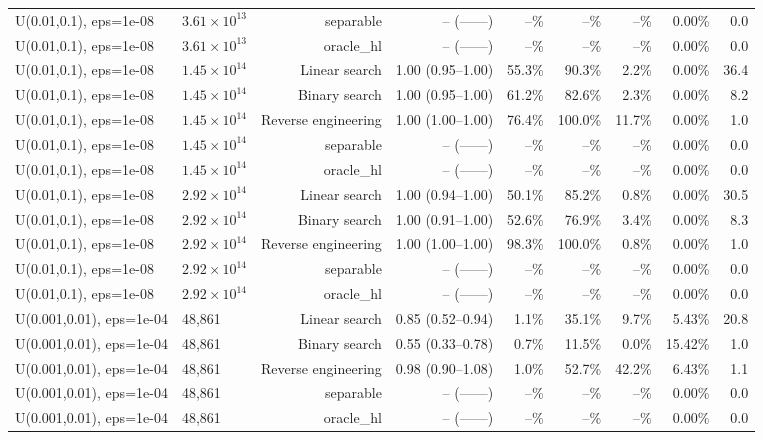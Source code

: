 \begin{tabular}{llrrrrrrr}
U(0.01,0.1), eps=1e-08 & $3.61\times 10^{13}$ & separable & -- (------) & --\% & --\% & --\% & 0.00\% & 0.0 \\
U(0.01,0.1), eps=1e-08 & $3.61\times 10^{13}$ & oracle_hl & -- (------) & --\% & --\% & --\% & 0.00\% & 0.0 \\
U(0.01,0.1), eps=1e-08 & $1.45\times 10^{14}$ & Linear search & 1.00 (0.95--1.00) & 55.3\% & 90.3\% & 2.2\% & 0.00\% & 36.4 \\
U(0.01,0.1), eps=1e-08 & $1.45\times 10^{14}$ & Binary search & 1.00 (0.95--1.00) & 61.2\% & 82.6\% & 2.3\% & 0.00\% & 8.2 \\
U(0.01,0.1), eps=1e-08 & $1.45\times 10^{14}$ & Reverse engineering & 1.00 (1.00--1.00) & 76.4\% & 100.0\% & 11.7\% & 0.00\% & 1.0 \\
U(0.01,0.1), eps=1e-08 & $1.45\times 10^{14}$ & separable & -- (------) & --\% & --\% & --\% & 0.00\% & 0.0 \\
U(0.01,0.1), eps=1e-08 & $1.45\times 10^{14}$ & oracle_hl & -- (------) & --\% & --\% & --\% & 0.00\% & 0.0 \\
U(0.01,0.1), eps=1e-08 & $2.92\times 10^{14}$ & Linear search & 1.00 (0.94--1.00) & 50.1\% & 85.2\% & 0.8\% & 0.00\% & 30.5 \\
U(0.01,0.1), eps=1e-08 & $2.92\times 10^{14}$ & Binary search & 1.00 (0.91--1.00) & 52.6\% & 76.9\% & 3.4\% & 0.00\% & 8.3 \\
U(0.01,0.1), eps=1e-08 & $2.92\times 10^{14}$ & Reverse engineering & 1.00 (1.00--1.00) & 98.3\% & 100.0\% & 0.8\% & 0.00\% & 1.0 \\
U(0.01,0.1), eps=1e-08 & $2.92\times 10^{14}$ & separable & -- (------) & --\% & --\% & --\% & 0.00\% & 0.0 \\
U(0.01,0.1), eps=1e-08 & $2.92\times 10^{14}$ & oracle_hl & -- (------) & --\% & --\% & --\% & 0.00\% & 0.0 \\
U(0.001,0.01), eps=1e-04 & 48,861 & Linear search & 0.85 (0.52--0.94) & 1.1\% & 35.1\% & 9.7\% & 5.43\% & 20.8 \\
U(0.001,0.01), eps=1e-04 & 48,861 & Binary search & 0.55 (0.33--0.78) & 0.7\% & 11.5\% & 0.0\% & 15.42\% & 1.0 \\
U(0.001,0.01), eps=1e-04 & 48,861 & Reverse engineering & 0.98 (0.90--1.08) & 1.0\% & 52.7\% & 42.2\% & 6.43\% & 1.1 \\
U(0.001,0.01), eps=1e-04 & 48,861 & separable & -- (------) & --\% & --\% & --\% & 0.00\% & 0.0 \\
U(0.001,0.01), eps=1e-04 & 48,861 & oracle_hl & -- (------) & --\% & --\% & --\% & 0.00\% & 0.0 \\

\end{tabular}
